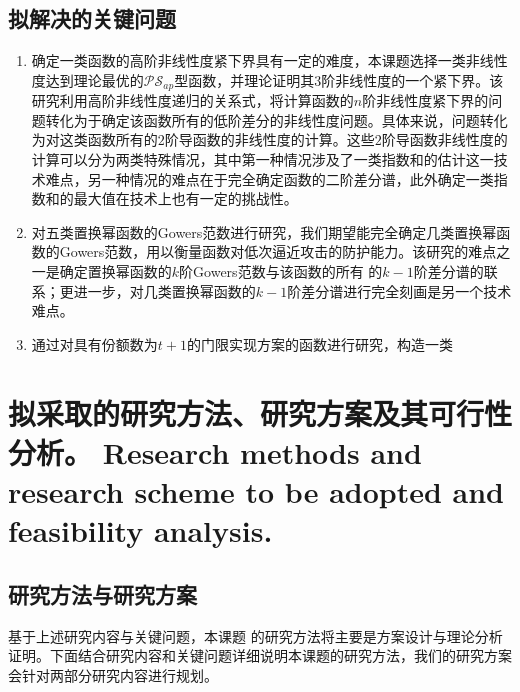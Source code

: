 \documentclass[a4paper,zihao=-4,AutoFakeBold]{ctexart}
\begin{document}
\subsection{拟解决的关键问题}
\begin{enumerate}[label=(\arabic{*})]
    \item 确定一类函数的高阶非线性度紧下界具有一定的难度，本课题选择一类非线性度达到理论最优的$\mathcal{PS}_{ap}$型函数，并理论证明其$3$阶非线性度的一个紧下界。该研究利用高阶非线性度递归的关系式，将计算函数的$n$阶非线性度紧下界的问题转化为于确定该函数所有的低阶差分的非线性度问题。具体来说，问题转化为对这类函数所有的$2$阶导函数的非线性度的计算。这些$2$阶导函数非线性度的计算可以分为两类特殊情况，其中第一种情况涉及了一类指数和的估计这一技术难点，另一种情况的难点在于完全确定函数的二阶差分谱，此外确定一类指数和的最大值在技术上也有一定的挑战性。
    \item 对五类置换幂函数的Gowers范数进行研究，我们期望能完全确定几类置换幂函数的Gowers范数，用以衡量函数对低次逼近攻击的防护能力。该研究的难点之一是确定置换幂函数的$k$阶Gowers范数与该函数的所有 的$k-1$阶差分谱的联系；更进一步，对几类置换幂函数的$k-1$阶差分谱进行完全刻画是另一个技术难点。
    \item 通过对具有份额数为$t+1$的门限实现方案的函数进行研究，构造一类
\end{enumerate}
\section{拟采取的研究方法、研究方案及其可行性分析。
  Research methods and research scheme to be adopted
  and feasibility analysis.}

\subsection{研究方法与研究方案}
基于上述研究内容与关键问题，本课题 的研究方法将主要是方案设计与理论分析证明。下面结合研究内容和关键问题详细说明本课题的研究方法，我们的研究方案会针对两部分研究内容进行规划。
\end{document}
